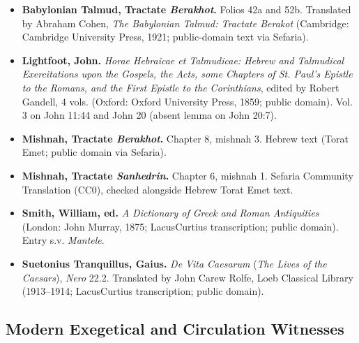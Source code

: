 \begin{itemize}
\item \textbf{Babylonian Talmud, Tractate \emph{Berakhot}.} Folios 42a and 52b. Translated by Abraham Cohen, \emph{The Babylonian Talmud: Tractate Berakot} (Cambridge: Cambridge University Press, 1921; public-domain text via Sefaria).
\item \textbf{Lightfoot, John.} \emph{Horae Hebraicae et Talmudicae: Hebrew and Talmudical Exercitations upon the Gospels, the Acts, some Chapters of St. Paul's Epistle to the Romans, and the First Epistle to the Corinthians}, edited by Robert Gandell, 4 vols. (Oxford: Oxford University Press, 1859; public domain). Vol. 3 on John 11:44 and John 20 (absent lemma on John 20:7).
\item \textbf{Mishnah, Tractate \emph{Berakhot}.} Chapter 8, mishnah 3. Hebrew text (Torat Emet; public domain via Sefaria).
\item \textbf{Mishnah, Tractate \emph{Sanhedrin}.} Chapter 6, mishnah 1. Sefaria Community Translation (CC0), checked alongside Hebrew Torat Emet text.
\item \textbf{Smith, William, ed.} \emph{A Dictionary of Greek and Roman Antiquities} (London: John Murray, 1875; LacusCurtius transcription; public domain). Entry s.v. \emph{Mantele}.
\item \textbf{Suetonius Tranquillus, Gaius.} \emph{De Vita Caesarum} (\emph{The Lives of the Caesars}), \emph{Nero} 22.2. Translated by John Carew Rolfe, Loeb Classical Library (1913--1914; LacusCurtius transcription; public domain).
\end{itemize}

\subsection{Modern Exegetical and Circulation Witnesses}


